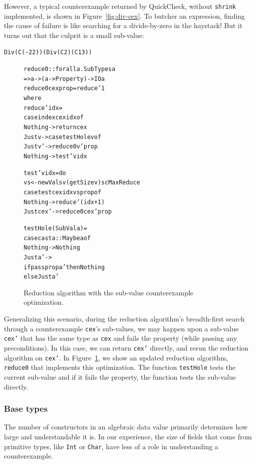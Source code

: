 \documentclass[10pt]{sigplanconf}
\newenvironment{code}{\begin{alltt}}{\end{alltt}}
\newcommand{\ttp}[1]{\texttt{#1}}
\begin{document}
However, a typical counterexample returned by QuickCheck, without \ttp{shrink}
implemented, is shown in Figure~\ref{fig:div-cex}.  To butcher an expression,
finding the cause of failure is like searching for a divide-by-zero in the
haystack!  But it turns out that the culprit is a small sub-value:
%
\begin{code}
Div (C (-22)) (Div (C 2) (C 13))
\end{code}
%

\begin{figure}
\begin{code}
reduce0 :: forall a . SubTypes a
        => a -> (a -> Property) -> IO a
reduce0 cex prop = reduce' 1
  where
  reduce' idx =
    case index cex idx of
      Nothing -> return cex
      Just v  -> case testHole v of
                   Just v' -> reduce0 v' prop
                   Nothing -> test' v idx

  test' v idx = do
    vs <- newVals v (getSize v) scMaxReduce
    case test cex idx vs prop of
      Nothing   -> reduce' (idx+1)
      Just cex' -> reduce0 cex' prop

  testHole (SubVal a) =
    case cast a :: Maybe a of
      Nothing -> Nothing
      Just a' ->
        if pass prop a' then Nothing
          else Just a'
\end{code}
  \caption{Reduction algorithm with the sub-value counterexample optimization.}
  \label{fig:reduce0}
\end{figure}

Generalizing this scenario, during the reduction algorithm's breadth-first
search through a counterexample \ttp{cex}'s sub-values, we may happen upon a
sub-value \ttp{cex'} that has the same type as \ttp{cex} and fails the property
(while passing any preconditions).  In this case, we can return \ttp{cex'}
directly, and rerun the reduction algorithm on \ttp{cex'}.  In
Figure~\ref{fig:reduce0}, we show an updated reduction algorithm, \ttp{reduce0}
that implements this optimization.  The function \ttp{testHole} tests the
current sub-value and if it fails the property, the function tests the sub-value
directly.

\subsubsection{Base types}

The number of constructors in an algebraic data value primarily determines how
large and understandable it is.  In our experience, the size of fields that come
from primitive types, like \ttp{Int} or \ttp{Char}, have less of a role in
understanding a counterexample.
\end{document}

